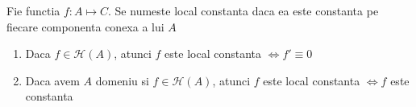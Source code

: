 \begin{definition}
	Fie functia $f:A \mapsto C$. Se numeste local constanta daca ea este
	constanta pe fiecare componenta conexa a lui $A$
\end{definition}

\begin{observation}\leavevmode
	\begin{enumerate}
		\item Daca $f \in \mathcal{H}(A)$, atunci $f$ este local constanta
		$\iff f' \equiv 0$
		\item Daca avem $A$ domeniu si $f \in \mathcal{H}(A)$, atunci $f$ este
		local constanta $\iff f$ este constanta
	\end{enumerate}
\end{observation}	

